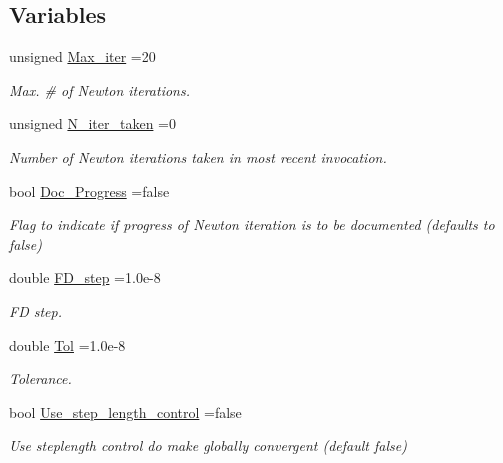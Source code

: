 \subsection*{Variables}
\begin{DoxyCompactItemize}
\item 
unsigned \hyperlink{namespaceoomph_1_1BlackBoxFDNewtonSolver_a20ac8568daf0d63afa3945a817ff3e2d}{Max\+\_\+iter} =20
\begin{DoxyCompactList}\small\item\em Max. \# of Newton iterations. \end{DoxyCompactList}\item 
unsigned \hyperlink{namespaceoomph_1_1BlackBoxFDNewtonSolver_a3067ba88fad991fdb619eae7533028bd}{N\+\_\+iter\+\_\+taken} =0
\begin{DoxyCompactList}\small\item\em Number of Newton iterations taken in most recent invocation. \end{DoxyCompactList}\item 
bool \hyperlink{namespaceoomph_1_1BlackBoxFDNewtonSolver_ac2603699f47446716ca5a818f46a7f17}{Doc\+\_\+\+Progress} =false
\begin{DoxyCompactList}\small\item\em Flag to indicate if progress of Newton iteration is to be documented (defaults to false) \end{DoxyCompactList}\item 
double \hyperlink{namespaceoomph_1_1BlackBoxFDNewtonSolver_a6f0d2ceb4451e66bb7ef4ab4fdb62bcf}{F\+D\+\_\+step} =1.\+0e-\/8
\begin{DoxyCompactList}\small\item\em FD step. \end{DoxyCompactList}\item 
double \hyperlink{namespaceoomph_1_1BlackBoxFDNewtonSolver_a4bacc59c8e1194e553f698530e9e945e}{Tol} =1.\+0e-\/8
\begin{DoxyCompactList}\small\item\em Tolerance. \end{DoxyCompactList}\item 
bool \hyperlink{namespaceoomph_1_1BlackBoxFDNewtonSolver_afd90cb451fb7ae5a8e30cab0a1884568}{Use\+\_\+step\+\_\+length\+\_\+control} =false
\begin{DoxyCompactList}\small\item\em Use steplength control do make globally convergent (default false) \end{DoxyCompactList}\end{DoxyCompactItemize}


